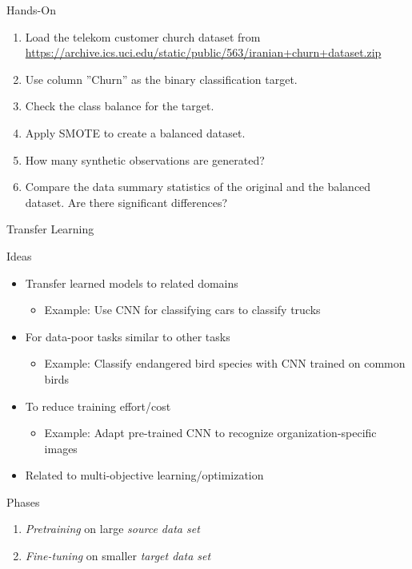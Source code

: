 \documentclass[ignorenonframetext,xcolor=x11names]{beamer}
\begin{document}
\begin{frame}{Hands-On}
\begin{enumerate}
  \item Load the telekom customer church dataset from\\
  \url{https://archive.ics.uci.edu/static/public/563/iranian+churn+dataset.zip}
  
  \item Use column ''Churn'' as the binary classification target.
  \item Check the class balance for the target.
  \item Apply SMOTE to create a balanced dataset.
  \item How many synthetic observations are generated?
  \item Compare the data summary statistics of the original and the balanced dataset. Are there significant differences?
\end{enumerate}
\end{frame}

\begin{frame}{Transfer Learning}

\begin{block}{Ideas}
\begin{itemize}
   \item Transfer learned models to related domains
   \begin{itemize}
      \item Example: Use CNN for classifying cars to classify trucks
   \end{itemize}
   \item For data-poor tasks similar to other tasks
   \begin{itemize}
      \item Example: Classify endangered bird species with CNN trained on common birds
   \end{itemize}
   \item To reduce training effort/cost
   \begin{itemize}
      \item Example: Adapt pre-trained CNN to recognize organization-specific images
   \end{itemize}
   \item Related to multi-objective learning/optimization
\end{itemize}
\end{block}

\begin{block}{Phases}
\begin{enumerate}
   \item \emph{Pretraining} on large \emph{source data set}
   \item \emph{Fine-tuning} on smaller \emph{target data set}
\end{enumerate}
\end{block}
\end{frame}
\end{document}

